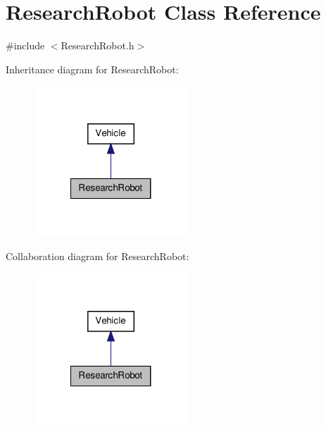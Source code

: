 \hypertarget{class_research_robot}{\section{Research\-Robot Class Reference}
\label{class_research_robot}
}


{\ttfamily \#include $<$Research\-Robot.\-h$>$}



Inheritance diagram for Research\-Robot\-:\nopagebreak
\begin{figure}[H]
\begin{center}
\leavevmode
\includegraphics[width=164pt]{class_research_robot__inherit__graph}
\end{center}
\end{figure}


Collaboration diagram for Research\-Robot\-:\nopagebreak
\begin{figure}[H]
\begin{center}
\leavevmode
\includegraphics[width=164pt]{class_research_robot__coll__graph}
\end{center}
\end{figure}
